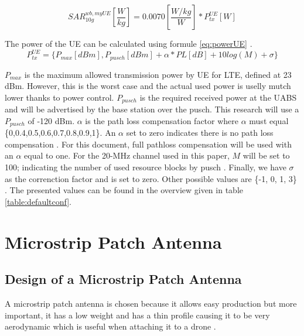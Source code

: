 \begin{equation} 
SAR^{wb,myUE}_{10g} \left[\frac{W}{kg}\right] = 0.0070 \left[\frac{W/kg}{W}\right] * P_{tx}^{UE} [W]
\label{eq:ulToSar}
\end{equation}

The power of the \gls{UE} can be calculated using formule \ref{eq:powerUE} \cite{J22_plets2015joint}.
\begin{equation} 
P_{tx}^{UE} = \big\{P_{max} [dBm] , P_{pusch} [dBm] + \alpha * PL [dB] + 10log(M) + \sigma \big\}
\label{eq:powerUE}
\end{equation}

$P_{max}$ is the maximum allowed transmission power by \gls{UE} for LTE, defined at 23 dBm. 
However, this is the worst case and the actual used power is uselly mutch lower thanks to power control.
$P_{pusch}$ is the required received power at the
\gls{UABS} and will be advertised by the base station over the \gls{pusch}. This research will use a
$P_{pusch}$ of -120 dBm. 
$\alpha$ is the path loss compensation factor where 
$\alpha$ must equal \{0,0.4,0.5,0.6,0.7,0.8,0.9,1\}. An $\alpha$ set to 
zero indicates there is no path loss compensation \cite{J32,J33}.
For this document, full pathloss compensation will be used with an $\alpha$ equal to one.
For the 20-MHz
channel used in this paper, $M$ will be set to 100; indicating the number of  used resource blocks by \gls{pusch} \cite{J22_plets2015joint}.
Finally, we have $\sigma$
 as the correnction factor and is set to zero. Other possible values are \{-1, 0, 1, 3\} \cite{J22_plets2015joint,J32}.
 The presented values can be found in the overview given in table \ref{table:defaultconf}.

\section{Microstrip Patch Antenna}
\subsection{Design of  a Microstrip Patch Antenna}
\label{sub:definingAntenna}
A microstrip patch antenna is chosen because it allows easy production but more important, it has a low weight 
and has a thin profile causing it to be very aerodynamic which is useful when attaching it to a drone \cite{J13_microstripadvantages}.

